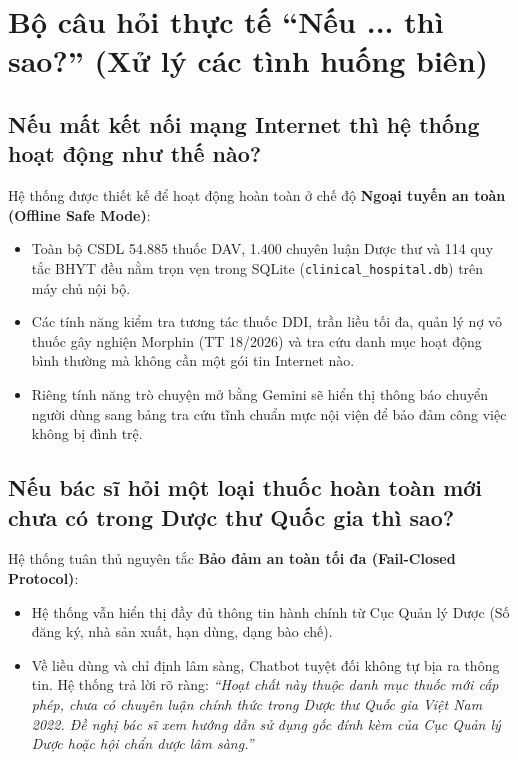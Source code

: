 \documentclass[12pt,a4paper]{article}
\begin{document}
\section{Bộ câu hỏi thực tế ``Nếu ... thì sao?'' (Xử lý các tình huống biên)}

\subsection{Nếu mất kết nối mạng Internet thì hệ thống hoạt động như thế nào?}
Hệ thống được thiết kế để hoạt động hoàn toàn ở chế độ \textbf{Ngoại tuyến an toàn (Offline Safe Mode)}:
\begin{itemize}[leftmargin=1.5em]
    \item Toàn bộ CSDL 54.885 thuốc DAV, 1.400 chuyên luận Dược thư và 114 quy tắc BHYT đều nằm trọn vẹn trong SQLite (\texttt{clinical\_hospital.db}) trên máy chủ nội bộ.
    \item Các tính năng kiểm tra tương tác thuốc DDI, trần liều tối đa, quản lý nợ vỏ thuốc gây nghiện Morphin (TT 18/2026) và tra cứu danh mục hoạt động bình thường mà không cần một gói tin Internet nào.
    \item Riêng tính năng trò chuyện mở bằng Gemini sẽ hiển thị thông báo chuyển người dùng sang bảng tra cứu tĩnh chuẩn mực nội viện để bảo đảm công việc không bị đình trệ.
\end{itemize}

\subsection{Nếu bác sĩ hỏi một loại thuốc hoàn toàn mới chưa có trong Dược thư Quốc gia thì sao?}
Hệ thống tuân thủ nguyên tắc \textbf{Bảo đảm an toàn tối đa (Fail-Closed Protocol)}:
\begin{itemize}[leftmargin=1.5em]
    \item Hệ thống vẫn hiển thị đầy đủ thông tin hành chính từ Cục Quản lý Dược (Số đăng ký, nhà sản xuất, hạn dùng, dạng bào chế).
    \item Về liều dùng và chỉ định lâm sàng, Chatbot tuyệt đối không tự bịa ra thông tin. Hệ thống trả lời rõ ràng: \textit{``Hoạt chất này thuộc danh mục thuốc mới cấp phép, chưa có chuyên luận chính thức trong Dược thư Quốc gia Việt Nam 2022. Đề nghị bác sĩ xem hướng dẫn sử dụng gốc đính kèm của Cục Quản lý Dược hoặc hội chẩn dược lâm sàng.''}
\end{itemize}
\end{document}
